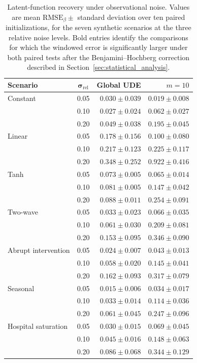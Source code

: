 \begin{table}[t]
\centering
\caption{Latent-function recovery under observational noise. Values are
mean $\mathrm{RMSE}_{\beta}\pm$ standard deviation over ten paired
initializations, for the seven synthetic scenarios at the three relative
noise levels. Bold entries identify the comparisons for which the windowed
error is significantly larger under both paired tests after the
Benjamini--Hochberg correction described in
Section~\ref{sec:statistical_analysis}.}
\label{tab:noise_beta}
\small
\begin{tabular}{lcrr}
\hline
\textbf{Scenario} &
$\boldsymbol{\sigma_{\mathrm{rel}}}$ &
\textbf{Global UDE} &
\textbf{$m=10$} \\
\hline

Constant
& 0.05 & $0.030\pm0.039$ & $0.019\pm0.008$ \\
& 0.10 & $0.027\pm0.024$ & $0.062\pm0.027$ \\
& 0.20 & $0.049\pm0.038$ & $\mathbf{0.195\pm0.045}$ \\[1mm]

Linear
& 0.05 & $0.178\pm0.156$ & $0.100\pm0.080$ \\
& 0.10 & $0.217\pm0.123$ & $0.225\pm0.117$ \\
& 0.20 & $0.348\pm0.252$ & $\mathbf{0.922\pm0.416}$ \\[1mm]

Tanh
& 0.05 & $0.073\pm0.005$ & $0.065\pm0.014$ \\
& 0.10 & $0.081\pm0.005$ & $\mathbf{0.147\pm0.042}$ \\
& 0.20 & $0.088\pm0.011$ & $\mathbf{0.254\pm0.091}$ \\[1mm]

Two-wave
& 0.05 & $0.033\pm0.023$ & $\mathbf{0.066\pm0.035}$ \\
& 0.10 & $0.061\pm0.030$ & $\mathbf{0.209\pm0.081}$ \\
& 0.20 & $0.153\pm0.095$ & $\mathbf{0.346\pm0.090}$ \\[1mm]

Abrupt intervention
& 0.05 & $0.024\pm0.007$ & $\mathbf{0.043\pm0.013}$ \\
& 0.10 & $0.058\pm0.020$ & $\mathbf{0.145\pm0.041}$ \\
& 0.20 & $0.162\pm0.093$ & $\mathbf{0.317\pm0.079}$ \\[1mm]

Seasonal
& 0.05 & $0.015\pm0.006$ & $\mathbf{0.034\pm0.017}$ \\
& 0.10 & $0.033\pm0.014$ & $\mathbf{0.114\pm0.036}$ \\
& 0.20 & $0.061\pm0.045$ & $\mathbf{0.247\pm0.096}$ \\[1mm]

Hospital saturation
& 0.05 & $0.030\pm0.015$ & $\mathbf{0.069\pm0.045}$ \\
& 0.10 & $0.045\pm0.016$ & $\mathbf{0.148\pm0.063}$ \\
& 0.20 & $0.086\pm0.068$ & $\mathbf{0.344\pm0.129}$ \\
\hline
\end{tabular}
\end{table}


